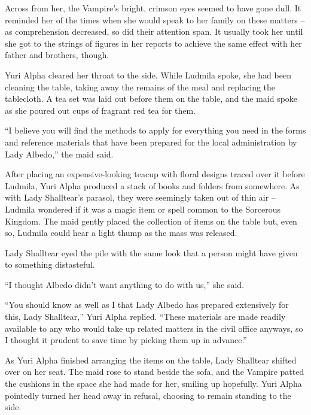  

Across from her, the Vampire’s bright, crimson eyes seemed to have gone dull. It reminded her of the times when she would speak to her family on these matters – as comprehension decreased, so did their attention span. It usually took her until she got to the strings of figures in her reports to achieve the same effect with her father and brothers, though.

 

Yuri Alpha cleared her throat to the side. While Ludmila spoke, she had been cleaning the table, taking away the remains of the meal and replacing the tablecloth. A tea set was laid out before them on the table, and the maid spoke as she poured out cups of fragrant red tea for them.

 

“I believe you will find the methods to apply for everything you need in the forms and reference materials that have been prepared for the local administration by Lady Albedo,” the maid said.

 

After placing an expensive-looking teacup with floral designs traced over it before Ludmila, Yuri Alpha produced a stack of books and folders from somewhere. As with Lady Shalltear’s parasol, they were seemingly taken out of thin air – Ludmila wondered if it was a magic item or spell common to the Sorcerous Kingdom. The maid gently placed the collection of items on the table but, even so, Ludmila could hear a light thump as the mass was released.

 

Lady Shalltear eyed the pile with the same look that a person might have given to something distasteful.

 

“I thought Albedo didn’t want anything to do with us,” she said.

 

“You should know as well as I that Lady Albedo has prepared extensively for this, Lady Shalltear,” Yuri Alpha replied. “These materials are made readily available to any who would take up related matters in the civil office anyways, so I thought it prudent to save time by picking them up in advance.”

 

As Yuri Alpha finished arranging the items on the table, Lady Shalltear shifted over on her seat. The maid rose to stand beside the sofa, and the Vampire patted the cushions in the space she had made for her, smiling up hopefully. Yuri Alpha pointedly turned her head away in refusal, choosing to remain standing to the side.

